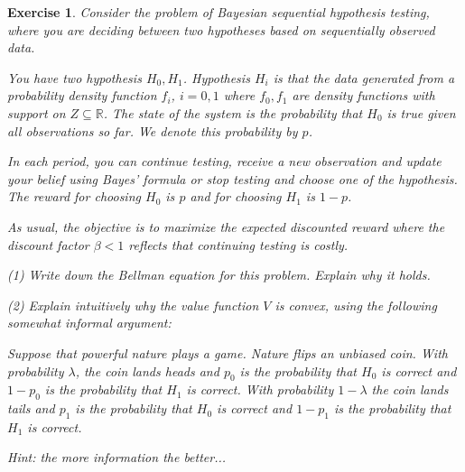\documentclass[letter,11pt]{article}
\newtheorem{exercise}{Exercise}[section]
\begin{document}
\begin{exercise}
    
Consider the problem of Bayesian sequential hypothesis testing, where you are deciding between two hypotheses based on sequentially observed data. 

You have two hypothesis $H_{0},H_{1}$. Hypothesis $H_{i}$ is that the data generated from a probability density function $f_{i}$, $i=0,1$ where $f_{0},f_{1}$ are density functions with support on $Z \subseteq \mathbb{R}$.   
The state of the system is the probability that \(H_0\) is true given all observations so far. We denote this probability by $p$.

In each period, you can 
   continue testing, receive a new observation and update your belief using Bayes' formula
   or stop testing and choose one of the hypothesis.  The reward  for choosing \(H_0\) is \(p\) and for choosing \(H_1\) is \(1-p\).

As usual, the objective is to maximize the expected discounted reward where 
the discount factor $\beta < 1$ reflects that continuing testing is costly. 


(1) Write down the Bellman equation for this problem. Explain why it holds.

(2) Explain intuitively why the value function \( V \) is convex, using the following somewhat informal argument: 


Suppose that powerful nature plays a game. 
Nature flips an unbiased coin. With probability \( \lambda \), the coin lands heads and  \( p_{0} \) is the probability that \( H_0 \) is correct and $1-p_{0}$ is the probability that $H_{1}$ is correct. With probability \( 1-\lambda \) the coin lands tails and  \( p_{1} \) is the probability that \( H_0 \) is correct and $1-p_{1}$ is the probability that $H_{1}$ is correct.

Hint: the more information the better... 

\end{exercise}
\end{document}
